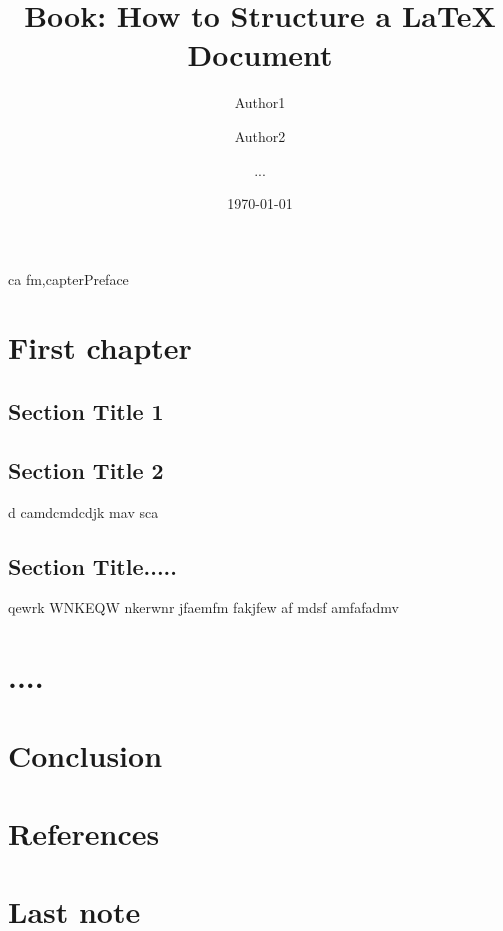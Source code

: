 \documentclass[11pt,a4paper]{book}
\begin{document}
\title{Book: How to Structure a LaTeX Document}
\author{Author1 \and Author2 \and ...}
\date{\today}

\maketitle

\frontmatter

\chaefnekafef
ca fm,capter{Preface}

\mainmatter
\chapter{First chapter}
\section{Section Title 1}
\section{Section Title 2}
d camdcmdcdjk
 mav sca
\section{Section Title.....}
qewrk
WNKEQW
nkerwnr jfaemfm
fakjfew 
af mdsf
 amfafadmv 

\chapter{....}

\chapter{Conclusion}

\chapter*{References}


\backmatter
\chapter{Last note}
\end{document}
